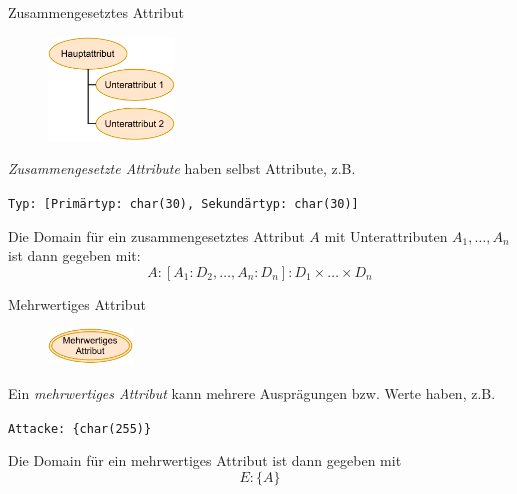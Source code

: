 \begin{defi}{Zusammengesetztes Attribut}
    \begin{figure}
        \begin{center}
            \includegraphics[width=0.3\textwidth]{includes/figures/definition_entity_relationship_model_attribute_combined_alt.pdf}
        \end{center}
    \end{figure}
    \emph{Zusammengesetzte Attribute} haben selbst Attribute, z.B.
    \begin{center}
        \texttt{Typ: [Primärtyp: char(30), Sekundärtyp: char(30)]}
    \end{center}

    Die Domain für ein zusammengesetztes Attribut $A$ mit Unterattributen $A_1, \ldots, A_n$ ist dann gegeben mit:
    \[
        A: [A_1 : D_2, \ldots, A_n:D_n]: D_1 \times \ldots \times D_n
    \]
\end{defi}

\begin{defi}{Mehrwertiges Attribut}
    \begin{figure}
        \begin{center}
            \includegraphics[width=0.2\textwidth]{includes/figures/definition_entity_relationship_model_attribute_multivalue.pdf}
        \end{center}
    \end{figure}
    Ein \emph{mehrwertiges Attribut} kann mehrere Ausprägungen bzw. Werte haben, z.B.
    \begin{center}
        \texttt{Attacke: \{char(255)\}}
    \end{center}

    Die Domain für ein mehrwertiges Attribut ist dann gegeben mit
    \[
        E : \{A\}
    \]
\end{defi}

